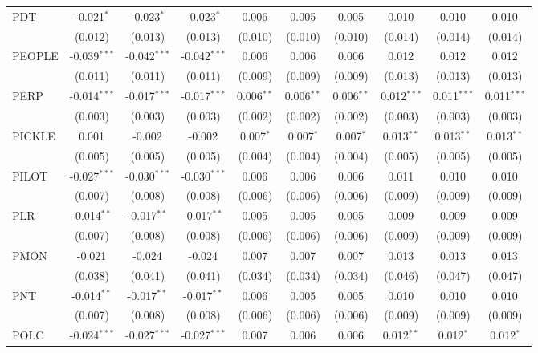 \begin{table}[!htbp]
\begin{tabular}{@{\extracolsep{5pt}}lccccccccc}
 PDT & -0.021$^{*}$ & -0.023$^{*}$ & -0.023$^{*}$ & 0.006$^{}$ & 0.005$^{}$ & 0.005$^{}$ & 0.010$^{}$ & 0.010$^{}$ & 0.010$^{}$ \\
  & (0.012) & (0.013) & (0.013) & (0.010) & (0.010) & (0.010) & (0.014) & (0.014) & (0.014) \\
 PEOPLE & -0.039$^{***}$ & -0.042$^{***}$ & -0.042$^{***}$ & 0.006$^{}$ & 0.006$^{}$ & 0.006$^{}$ & 0.012$^{}$ & 0.012$^{}$ & 0.012$^{}$ \\
  & (0.011) & (0.011) & (0.011) & (0.009) & (0.009) & (0.009) & (0.013) & (0.013) & (0.013) \\
 PERP & -0.014$^{***}$ & -0.017$^{***}$ & -0.017$^{***}$ & 0.006$^{**}$ & 0.006$^{**}$ & 0.006$^{**}$ & 0.012$^{***}$ & 0.011$^{***}$ & 0.011$^{***}$ \\
  & (0.003) & (0.003) & (0.003) & (0.002) & (0.002) & (0.002) & (0.003) & (0.003) & (0.003) \\
 PICKLE & 0.001$^{}$ & -0.002$^{}$ & -0.002$^{}$ & 0.007$^{*}$ & 0.007$^{*}$ & 0.007$^{*}$ & 0.013$^{**}$ & 0.013$^{**}$ & 0.013$^{**}$ \\
  & (0.005) & (0.005) & (0.005) & (0.004) & (0.004) & (0.004) & (0.005) & (0.005) & (0.005) \\
 PILOT & -0.027$^{***}$ & -0.030$^{***}$ & -0.030$^{***}$ & 0.006$^{}$ & 0.006$^{}$ & 0.006$^{}$ & 0.011$^{}$ & 0.010$^{}$ & 0.010$^{}$ \\
  & (0.007) & (0.008) & (0.008) & (0.006) & (0.006) & (0.006) & (0.009) & (0.009) & (0.009) \\
 PLR & -0.014$^{**}$ & -0.017$^{**}$ & -0.017$^{**}$ & 0.005$^{}$ & 0.005$^{}$ & 0.005$^{}$ & 0.009$^{}$ & 0.009$^{}$ & 0.009$^{}$ \\
  & (0.007) & (0.008) & (0.008) & (0.006) & (0.006) & (0.006) & (0.009) & (0.009) & (0.009) \\
 PMON & -0.021$^{}$ & -0.024$^{}$ & -0.024$^{}$ & 0.007$^{}$ & 0.007$^{}$ & 0.007$^{}$ & 0.013$^{}$ & 0.013$^{}$ & 0.013$^{}$ \\
  & (0.038) & (0.041) & (0.041) & (0.034) & (0.034) & (0.034) & (0.046) & (0.047) & (0.047) \\
 PNT & -0.014$^{**}$ & -0.017$^{**}$ & -0.017$^{**}$ & 0.006$^{}$ & 0.005$^{}$ & 0.005$^{}$ & 0.010$^{}$ & 0.010$^{}$ & 0.010$^{}$ \\
  & (0.007) & (0.008) & (0.008) & (0.006) & (0.006) & (0.006) & (0.009) & (0.009) & (0.009) \\
 POLC & -0.024$^{***}$ & -0.027$^{***}$ & -0.027$^{***}$ & 0.007$^{}$ & 0.006$^{}$ & 0.006$^{}$ & 0.012$^{**}$ & 0.012$^{*}$ & 0.012$^{*}$ \\

\end{tabular}
\end{table}
